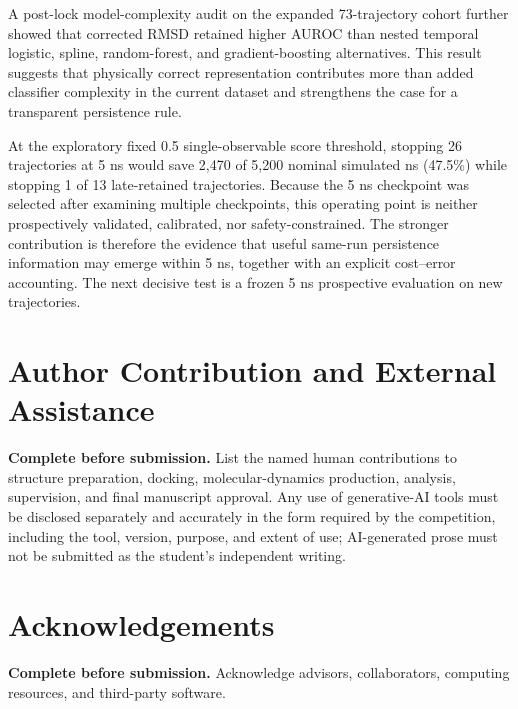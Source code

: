 \documentclass[11pt]{article}
\begin{document}
A post-lock model-complexity audit on the expanded 73-trajectory cohort further showed that corrected RMSD retained higher AUROC than nested temporal logistic, spline, random-forest, and gradient-boosting alternatives. This result suggests that physically correct representation contributes more than added classifier complexity in the current dataset and strengthens the case for a transparent persistence rule.

At the exploratory fixed 0.5 single-observable score threshold, stopping 26 trajectories at 5 ns would save 2,470 of 5,200 nominal simulated ns (47.5\%) while stopping 1 of 13 late-retained trajectories. Because the 5 ns checkpoint was selected after examining multiple checkpoints, this operating point is neither prospectively validated, calibrated, nor safety-constrained. The stronger contribution is therefore the evidence that useful same-run persistence information may emerge within 5 ns, together with an explicit cost--error accounting. The next decisive test is a frozen 5 ns prospective evaluation on new trajectories.

\section*{Author Contribution and External Assistance}

\textbf{Complete before submission.} List the named human contributions to structure preparation, docking, molecular-dynamics production, analysis, supervision, and final manuscript approval. Any use of generative-AI tools must be disclosed separately and accurately in the form required by the competition, including the tool, version, purpose, and extent of use; AI-generated prose must not be submitted as the student's independent writing.

\section*{Acknowledgements}

\textbf{Complete before submission.} Acknowledge advisors, collaborators, computing resources, and third-party software.
\end{document}
